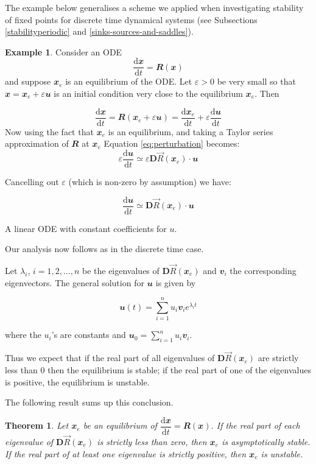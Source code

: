 \documentclass[
  a4paper,
  oneside,
  final]{krantz}
\renewcommand{\epsilon}{\varepsilon}
\renewcommand{\d}{\mathrm{d}}
\renewcommand{\v}[1]{{\mathbfit{#1}}}
\newcommand{\der}[2]{\dfrac{\d #1}{\d #2}}
\newcommand{\jacobr}{\mathbf{D}\vec{R}}
\newtheorem{theorem}{Theorem}[chapter]
\theoremstyle{definition}
\theoremstyle{definition}
\newtheorem{example}{Example}[chapter]
\theoremstyle{definition}
\theoremstyle{definition}
\theoremstyle{remark}
\begin{document}
The example below generalises a scheme we applied when investigating stability of fixed points for discrete time dynamical systems (see Subsections \ref{stabilityperiodic} and \ref{sinks-sources-and-saddles}).

\begin{example}
\protect\hypertarget{exm:stabilityschematic}{}\label{exm:stabilityschematic}Consider an ODE
\[ \der{\v{x}}{t} = \v{R}(\v{x}) \]
and suppose \(\v{x}_{e}\) is an equilibrium of the ODE. Let \(\epsilon>0\) be very small so that \(\v{x} = \v{x}_{e} + \epsilon \v{u}\) is an initial condition very close to the equilibrium \(\v{x}_{e}\). Then

\begin{equation}
\der{\v{x}}{t} = \v{R}(\v{x}_{e} + \epsilon \v{u}) = \der{\v{x}_{e}}{t} + \epsilon \der{\v{u}}{t} \label{eq:perturbation}
\end{equation}
Now using the fact that \(\v{x}_{e}\) is an equilibrium, and taking a Taylor series approximation of \(\v{R}\) at \(\v{x}_{e}\) Equation \eqref{eq:perturbation} becomes:
\[ \epsilon \der{\v{u}}{t} \simeq \epsilon \jacobr(\v{x}_{e}) \cdot \v{u} \]

Cancelling out \(\epsilon\) (which is non-zero by assumption) we have:

\[ \der{\v{u}}{t} \simeq  \jacobr(\v{x}_{e}) \cdot \v{u} \]

A linear ODE with constant coefficients for \(u\).

Our analysis now follows as in the discrete time case.

Let \(\lambda_{i}\), \(i = 1,2,\ldots, n\) be the eigenvalues of \(\jacobr(\v{x}_{e})\) and \(\v{v}_{i}\) the corresponding eigenvectors. The general solution for \(\v{u}\) is given by

\[\v{u}(t) = \sum_{i =1}^{n} {u}_i \v{v}_{i} e^{\lambda_i t} \]

where the \(u_i\)'s are constants and \(\v{u}_{0} = \sum_{i =1}^{n} {u}_i \v{v}_{i}\).

Thus we expect that if the real part of all eigenvalues of \(\jacobr(\v{x}_{e})\) are strictly less than \(0\) then the equilibrium is stable; if the real part of one of the eigenvalues is positive, the equilibrium is unstable.
\end{example}

The following result sums up this conclusion.

\begin{theorem}
\protect\hypertarget{thm:stabilityconttime}{}\label{thm:stabilityconttime}Let \(\v{x}_{e}\) be an equilibrium of \(\der{\v{x}}{t} = \v{R}(\v{x})\). If the real part of each eigenvalue of \(\jacobr(\v{x}_{e})\) is strictly less than zero, then \(\v{x}_{e}\) is asymptotically stable. If the real part of at least one eigenvalue is strictly positive, then \(\v{x}_{e}\) is unstable.
\end{theorem}
\end{document}
